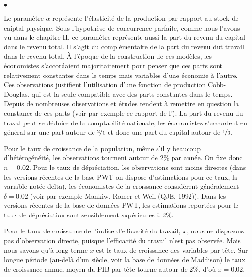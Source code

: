 \documentclass[10pt,notheorems]{beamer}
\theoremstyle{plain}
\theoremstyle{definition} %
\begin{document}
\begin{notes}

  \begin{list}{$\bullet$}{}

  \item Le paramètre $\alpha$ représente l'élasticité de la production par
    rapport au stock de caiptal physique. Sous l'hypothèse de concurrence
    parfaite, comme nous l'avons vu dans le chapitre II, ce paramètre représente
    aussi la part du revenu du capital dans le revenu total. Il s'agit du
    complémentaire de la part du revenu dut travail dans le revenu total. À
    l'époque de la construction de ces modèles, les économistes s'accordaient
    majoritairement pour penser que ces parts sont relativement constantes dans
    le temps mais variables d'une économie à l'autre. Ces observations
    justifient l'utilisation d'une fonction de production Cobb-Douglas, qui est
    la seule compatible avec des parts constantes dans le temps. Depuis de
    nombreuses observations et études tendent à remettre en question la
    constance de ces parts (voir par exemple ce rapport de
    l'\href{https://www.oecd.org/g20/topics/employment-and-social-policy/The-Labour-Share-in-G20-Economies.pdf}{}).
    La part du revenu du traval peut se déduire de la comptabilité nationale,
    les économistes s'accordent en général sur une part autour de
    $\nicefrac{2}{1}$ et donc une part du capital autour de $\nicefrac{1}{3}$.\newline

  \item Pour le taux de croissance de la population, même s'il y beaucoup
    d'hétérogénéité, les observations tournent autour de 2\% par année. On fixe
    donc $n=0.02$. Pour le taux de dépréciation, les observations sont moins
    directes (dans les versions récentes de la base PWT on dispose d'estimations
    pour ce taux, la variable notée \textrm{delta}), les économistes de la
    croissance considèrent généralement $\delta=0.02$ (voir par exemple Mankiw,
    Romer et Weil (QJE, 1992)). Dans les versions récentes de la base de données
    PWT, les estimations reportées pour le taux de dépréciation sont
    sensiblement supérieures à 2\%.

  \item Pour le taux de croissance de l'indice d'efficacité du travail, $x$,
    nous ne disposons pas d'observation directe, puisque l'efficacité du travail
    n'est pas observée. Mais nous savons qu'à long terme $x$ est le taux de
    croissance des variables par tête. Sur longue période (au-delà d'un siècle,
    voir la base de données de Maddison) le taux de croissance annuel moyen du
    PIB par tête tourne autour de 2\%, d'où $x =0.02$.



\end{list}
\end{notes}
\end{document}
